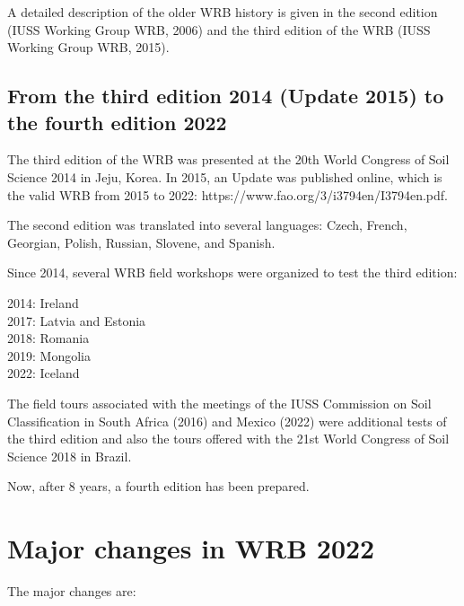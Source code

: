 \documentclass[
  letterpaper,
  DIV=11,
  numbers=noendperiod]{scrreprt}
\begin{document}
A detailed description of the older WRB history is given in the second
edition (IUSS Working Group WRB, 2006) and the third edition of the WRB
(IUSS Working Group WRB, 2015).

\hypertarget{from-the-third-edition-2014-update-2015-to-the-fourth-edition-2022}{%
\subsection{From the third edition 2014 (Update 2015) to the fourth
edition
2022}\label{from-the-third-edition-2014-update-2015-to-the-fourth-edition-2022}}

The third edition of the WRB was presented at the 20th World Congress of
Soil Science 2014 in Jeju, Korea. In 2015, an Update was published
online, which is the valid WRB from 2015 to 2022:
https://www.fao.org/3/i3794en/I3794en.pdf.

The second edition was translated into several languages: Czech, French,
Georgian, Polish, Russian, Slovene, and Spanish.

Since 2014, several WRB field workshops were organized to test the third
edition:

2014: Ireland\\
2017: Latvia and Estonia\\
2018: Romania\\
2019: Mongolia\\
2022: Iceland

The field tours associated with the meetings of the IUSS Commission on
Soil Classification in South Africa (2016) and Mexico (2022) were
additional tests of the third edition and also the tours offered with
the 21st World Congress of Soil Science 2018 in Brazil.

Now, after 8 years, a fourth edition has been prepared.

\hypertarget{major-changes-in-wrb-2022}{%
\section{Major changes in WRB 2022}\label{major-changes-in-wrb-2022}}

The major changes are:
\end{document}
